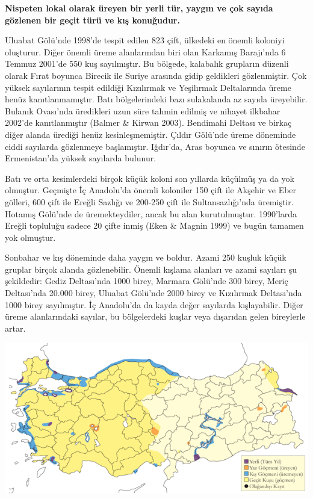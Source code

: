 \documentclass[
  letterpaper,
  DIV=11,
  numbers=noendperiod]{scrreprt}
\begin{document}
\textbf{Nispeten lokal olarak üreyen bir yerli tür, yaygın ve çok sayıda
gözlenen bir geçit türü ve kış konuğudur.}

Uluabat Gölü'nde 1998'de tespit edilen 823 çift, ülkedeki en önemli
koloniyi oluşturur. Diğer önemli üreme alanlarından biri olan Karkamış
Barajı'nda 6 Temmuz 2001'de 550 kuş sayılmıştır. Bu bölgede, kalabalık
grupların düzenli olarak Fırat boyunca Birecik ile Suriye arasında gidip
geldikleri gözlenmiştir. Çok yüksek sayılarının tespit edildiği
Kızılırmak ve Yeşilırmak Deltalarında üreme henüz kanıtlanmamıştır. Batı
bölgelerindeki bazı sulakalanda az sayıda üreyebilir. Bulanık Ovası'nda
üredikleri uzun süre tahmin edilmiş ve nihayet ilkbahar 2002'de
kanıtlanmıştır (Balmer \& Kirwan 2003). Bendimahi Deltası ve birkaç
diğer alanda ürediği henüz kesinleşmemiştir. Çıldır Gölü'nde üreme
döneminde ciddi sayılarda gözlenmeye başlamıştır. Iğdır'da, Aras boyunca
ve sınırın ötesinde Ermenistan'da yüksek sayılarda bulunur.

Batı ve orta kesimlerdeki birçok küçük koloni son yıllarda küçülmüş ya
da yok olmuştur. Geçmişte İç Anadolu'da önemli koloniler 150 çift ile
Akşehir ve Eber gölleri, 600 çift ile Ereğli Sazlığı ve 200-250 çift ile
Sultansazlığı'nda üremiştir. Hotamış Gölü'nde de üremekteydiler, ancak
bu alan kurutulmuştur. 1990'larda Ereğli topluluğu sadece 20 çifte inmiş
(Eken \& Magnin 1999) ve bugün tamamen yok olmuştur.

Sonbahar ve kış döneminde daha yaygın ve boldur. Azami 250 kuşluk küçük
gruplar birçok alanda gözlenebilir. Önemli kışlama alanları ve azami
sayıları şu şekildedir: Gediz Deltası'nda 1000 birey, Marmara Gölü'nde
300 birey, Meriç Deltası'nda 20.000 birey, Uluabat Gölü'nde 2000 birey
ve Kızılırmak Deltası'nda 1000 birey sayılmıştır. İç Anadolu'da da kayda
değer sayılarda kışlayabilir. Diğer üreme alanlarındaki sayılar, bu
bölgelerdeki kuşlar veya dışarıdan gelen bireylerle artar.

\includegraphics{images/harita_Page_077.png}
\end{document}
